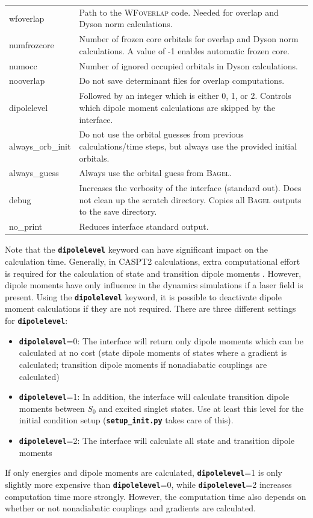 \documentclass[a4paper,10pt,DIV=15,openany]{scrbook}
\newcommand{\ttt}[1]{\textbf{\texttt{#1}}}
\begin{document}
\begin{table}
\begin{tabular}{>{\ttfamily}lp{12cm}}
\\
wfoverlap               &Path to the \textsc{WFoverlap} code. Needed for overlap and Dyson norm calculations.
\\
numfrozcore             &Number of frozen core orbitals for overlap and Dyson norm calculations. A value of -1 enables automatic frozen core.
\\
numocc                  &Number of ignored occupied orbitals in Dyson calculations.
\\
nooverlap               &Do not save determinant files for overlap computations.
\\
dipolelevel             &Followed by an integer which is either 0, 1, or 2. Controls which dipole moment calculations are skipped by the interface.
\\
always\_orb\_init       &Do not use the orbital guesses from previous calculations/time steps, but always use the provided initial orbitals.
\\
always\_guess           &Always use the orbital guess from \textsc{Bagel}.
\\
  debug                 &Increases the verbosity of the interface (standard out). Does not clean up the scratch directory. Copies all \textsc{Bagel} outputs to the save directory.
\\
  no\_print             &Reduces interface standard output.
\\
  \hline
  \end{tabular}
\end{table}


Note that the \ttt{dipolelevel} keyword can have significant impact on the calculation time.
Generally, in CASPT2 calculations, extra computational effort is required for the calculation of state and transition dipole moments .
However, dipole moments have only influence in the dynamics simulations if a laser field is present.
Using the \ttt{dipolelevel} keyword, it is possible to deactivate dipole moment calculations if they are not required.
There are three different settings for \ttt{dipolelevel}: 
\begin{itemize}
  \item \ttt{dipolelevel}=0: The interface will return only dipole moments which can be calculated at no cost (state dipole moments of states where a gradient is calculated; transition dipole moments if nonadiabatic couplings are calculated)
  \item \ttt{dipolelevel}=1: In addition, the interface will calculate transition dipole moments between $S_0$ and excited singlet states. Use at least this level for the initial condition setup (\ttt{setup\_init.py} takes care of this).
  \item \ttt{dipolelevel}=2: The interface will calculate all state and transition dipole moments
\end{itemize}
If only energies and dipole moments are calculated, \ttt{dipolelevel}=1 is only slightly more expensive than \ttt{dipolelevel}=0, while \ttt{dipolelevel}=2 increases computation time more strongly.
However, the computation time also depends on whether or not nonadiabatic couplings and gradients are calculated. 
\end{document}
